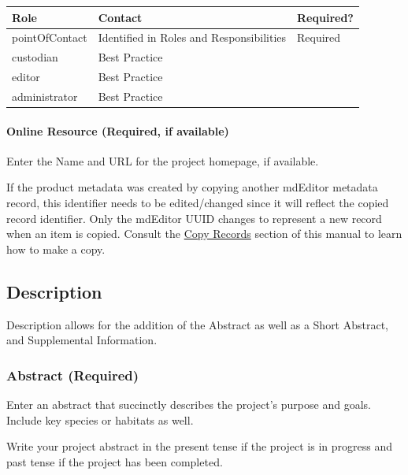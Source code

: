 \documentclass[
]{book}
\makeatletter
\let\oldparagraph\paragraph
\renewcommand{\paragraph}[1]{\oldparagraph{#1}\mbox{}}
\newenvironment{kframe}{%
\medskip{}
\setlength{\fboxsep}{.8em}
 \def\at@end@of@kframe{}%
 \ifinner\ifhmode%
  \def\at@end@of@kframe{\end{minipage}}%
  \begin{minipage}{\columnwidth}%
 \fi\fi%
 \def\FrameCommand##1{\hskip\@totalleftmargin \hskip-\fboxsep
 \colorbox{shadecolor}{##1}\hskip-\fboxsep
     \hskip-\linewidth \hskip-\@totalleftmargin \hskip\columnwidth}%
 \MakeFramed {\advance\hsize-\width
   \@totalleftmargin\z@ \linewidth\hsize
   \@setminipage}}%
 {\par\unskip\endMakeFramed%
 \at@end@of@kframe}
\newenvironment{rmdblock}[1]
  {
  \begin{itemize}
  \renewcommand{\labelitemi}{
    \raisebox{-.7\height}[0pt][0pt]{
      {\setkeys{Gin}{width=3em,keepaspectratio}\texttt{[image: images/\#1]}}
    }
  }
  \setlength{\fboxsep}{1em}
  \begin{kframe}
  \item
  }
  {
  \end{kframe}
  \end{itemize}
  }
\newenvironment{rmdcaution}
  {\begin{rmdblock}{caution}}
  {\end{rmdblock}}
\newenvironment{rmdtip}
  {\begin{rmdblock}{tip}}
  {\end{rmdblock}}
\makeatother
\begin{document}
\begin{longtable}[]{@{}lll@{}}
\toprule
Role & Contact & Required?\tabularnewline
\midrule
\endhead
pointOfContact & Identified in Roles and Responsibilities & Required\tabularnewline
custodian & Best Practice &\tabularnewline
editor & Best Practice &\tabularnewline
administrator & Best Practice &\tabularnewline
\bottomrule
\end{longtable}

\hypertarget{online-resource-required-if-available}{%
\paragraph{Online Resource (Required, if available)}\label{online-resource-required-if-available}}

Enter the Name and URL for the project homepage, if available.

\begin{rmdcaution}
If the product metadata was created by copying another mdEditor metadata
record, this identifier needs to be edited/changed since it will reflect
the copied record identifier. Only the mdEditor UUID changes to
represent a new record when an item is copied. Consult the
\protect\hyperlink{copy-records}{Copy Records} section of this manual to
learn how to make a copy.
\end{rmdcaution}

\hypertarget{description-1}{%
\subsection*{Description}\label{description-1}}

Description allows for the addition of the Abstract as well as a Short Abstract, and Supplemental Information.

\hypertarget{abstract-required-1}{%
\subsubsection*{Abstract (Required)}\label{abstract-required-1}}

Enter an abstract that succinctly describes the project's purpose and goals. Include key species or habitats as well.

\begin{rmdtip}
Write your project abstract in the present tense if the project is in
progress and past tense if the project has been completed.
\end{rmdtip}
\end{document}
